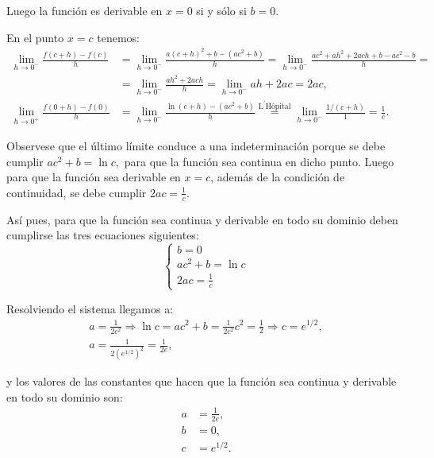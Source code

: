 {Luego la función es derivable en $x=0$ si y sólo si $b=0$.

En el punto $x=c$ tenemos:
\begin{align*}
\lim_{h\rightarrow 0^{-}}\frac{f(c+h)-f(c)}{h} &= \lim_{h\rightarrow 0^{-}}\frac{a(c+h)^2+b-(ac^2+b)}{h} = \lim_{h\rightarrow 0^{-}}\frac{ac^2+ah^2+2ach+b-ac^2-b}{h}= \\
&= \lim_{h\rightarrow 0^{-}}\frac{ah^2+2ach}{h} = \lim_{h\rightarrow 0^{-}}ah+2ac=2ac, \\
\lim_{h\rightarrow 0^{+}}\frac{f(0+h)-f(0)}{h} &= \lim_{h\rightarrow 0^{-}}\frac{\ln (c+h)-(ac^2+b)}{h}\stackrel{\text{L}^{\prime }\text{H\^{o}pital}}{=} \lim_{h\rightarrow 0^{-}}\frac{1/(c+h)}{1} = \frac{1}{c}.
\end{align*}

Observese que el último límite conduce a una indeterminación porque se debe cumplir $ac^2+b=\ln c,$ para que la función sea continua en dicho punto. Luego para que la función sea derivable en $x=c$, además de la condición de continuidad, se debe cumplir $2ac = \frac{1}{c}$.

Así pues, para que la función sea continua y derivable en todo su dominio deben cumplirse las tres ecuaciones siguientes:
\[
\begin{cases}
b=0 \\
ac^2+b = \ln c\\
2ac = \frac 1c
\end{cases}
\]

Resolviendo el sistema llegamos a:
\[
\renewcommand{\arraystretch}{2.5}
\begin{array}{c}
\displaystyle
a = \frac{1}{2c^2} \Longrightarrow \ln c = ac^2+b = \frac{1}{2c^2}c^2 = \frac{1}{2} \Longrightarrow c = e^{1/2}, \\
\displaystyle a = \frac{1}{2(e^{1/2})^2} = \frac{1}{2e},
\end{array}
\]

y los valores de las constantes que hacen que la función sea continua y derivable en todo su dominio son:
\begin{align*}
a &= \frac{1}{2e},\\
b &= 0, \\
c &= e^{1/2}.
\end{align*}
}



